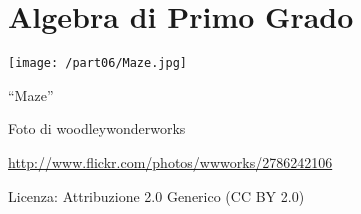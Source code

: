 \part{Algebra di Primo Grado}
\texttt{[image: /part06/Maze.jpg]}
  \begin{center}
    {\large ``Maze''}\par
    Foto di woodleywonderworks\par
    \url{http://www.flickr.com/photos/wwworks/2786242106}\par
    Licenza: Attribuzione 2.0 Generico (CC BY 2.0)\par
  \end{center}
\clearpage
\cleardoublepage
